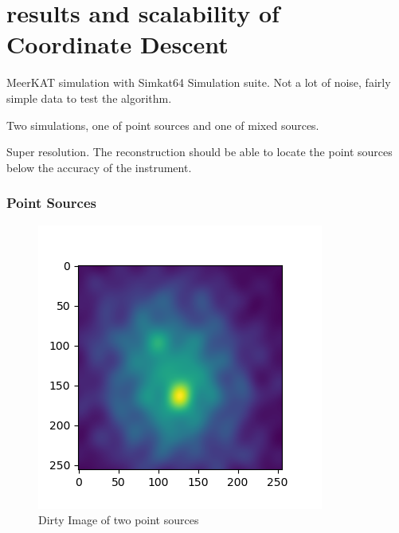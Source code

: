 \section{results and scalability of Coordinate Descent}


MeerKAT simulation with Simkat64 Simulation suite. Not a lot of noise, fairly simple data to test the algorithm.

Two simulations, one of point sources and one of mixed sources. 

Super resolution. The reconstruction should be able to locate the point sources below the accuracy of the instrument.

\subsubsection{Point Sources}

\begin{figure}[h]
	\centering
	\includegraphics[width=0.5\linewidth]{./chapters/05.algorithms/sim02/sim02_point_dirty.png}
	\caption{Dirty Image of two point sources}
	\label{alg:point:dirty}
\end{figure}

